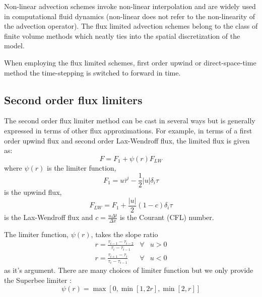 Non-linear advection schemes invoke non-linear interpolation and are
widely used in computational fluid dynamics (non-linear does not refer
to the non-linearity of the advection operator). The flux limited
advection schemes belong to the class of finite volume methods which
neatly ties into the spatial discretization of the model.

When employing the flux limited schemes, first order upwind or
direct-space-time method the time-stepping is switched to forward in
time.

\subsection{Second order flux limiters}

The second order flux limiter method can be cast in several ways but
is generally expressed in terms of other flux approximations. For
example, in terms of a first order upwind flux and second order
Lax-Wendroff flux, the limited flux is given as:
\begin{equation}
F = F_1 + \psi(r) F_{LW}
\end{equation}
where $\psi(r)$ is the limiter function,
\begin{equation}
F_1 = u \overline{\tau}^i - \frac{1}{2} |u| \delta_i \tau
\end{equation}
is the upwind flux,
\begin{equation}
F_{LW} = F_1 + \frac{|u|}{2} (1-c) \delta_i \tau
\end{equation}
is the Lax-Wendroff flux and $c = \frac{u \Delta t}{\Delta x}$ is the
Courant (CFL) number.

The limiter function, $\psi(r)$, takes the slope ratio
\begin{eqnarray}
r = \frac{ \tau_{i-1} - \tau_{i-2} }{ \tau_{i} - \tau_{i-1} } & \forall & u > 0
\\
r = \frac{ \tau_{i+1} - \tau_{i} }{ \tau_{i} - \tau_{i-1} } & \forall & u < 0
\end{eqnarray}
as it's argument. There are many choices of limiter function but we
only provide the Superbee limiter \cite{roe:85}:
\begin{equation}
\psi(r) = \max[0,\min[1,2r],\min[2,r]]
\end{equation}

